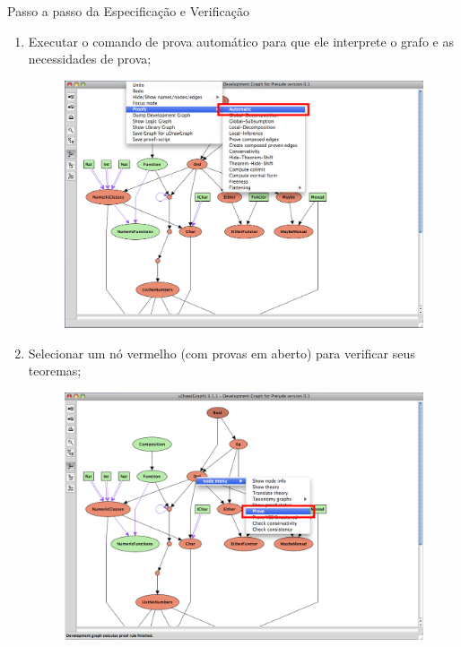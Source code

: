 \documentclass{beamer}
\begin{document}
\begin{frame}[allowframebreaks]{Passo a passo da Especificação e Verificação}
\begin{enumerate}
		\item Executar o comando de prova automático para que ele interprete o grafo e as necessidades de prova;
		\begin{figure}
			\includegraphics[height=0.7\textheight]{figuras/passo_a_passo/Picture03.png}
		\end{figure}
		
		\item Selecionar um nó vermelho (com provas em aberto) para verificar seus teoremas;
		\begin{figure}
			\includegraphics[height=0.7\textheight]{figuras/passo_a_passo/Picture04.png}
		\end{figure}
		

\end{enumerate}
\end{frame}
\end{document}

